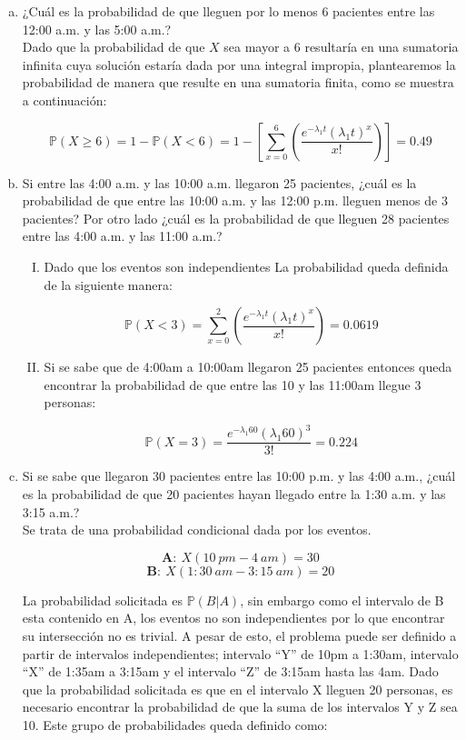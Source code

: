 \documentclass[11pt, spanish]{article}
\begin{document}
\begin{enumerate}[(a)]
\item ¿Cuál es la probabilidad de que lleguen por lo menos 6 pacientes entre las 12:00
a.m. y las 5:00 a.m.?\\

Dado que la probabilidad de que $X$ sea mayor a 6 resultaría en una sumatoria
infinita cuya solución estaría dada por una integral impropia, plantearemos la
probabilidad de manera que resulte en una sumatoria finita, como se muestra a
continuación:

$$\mathbb{P}(X \geq 6) = 1 - \mathbb{P}(X < 6)  = 1 - \left[ \sum_{x = 0}^{6} \left( \frac{e^{-\lambda_{1} t}(\lambda_{1} t)^{x}}{x!} \right)\right] = 0.49$$

\item Si entre las 4:00 a.m. y las 10:00 a.m. llegaron 25 pacientes, ¿cuál es la
probabilidad de que entre las 10:00 a.m. y las 12:00 p.m. lleguen menos de 3 pacientes? Por
otro lado ¿cuál es la probabilidad de que lleguen 28 pacientes entre las 4:00 a.m. y las 11:00
a.m.?\\

\begin{enumerate}[(I)]

\item Dado que los eventos son independientes La probabilidad queda definida de la
siguiente manera:

 $$\mathbb{P}(X < 3) = \sum_{x = 0}^{2} \left( \frac{e^{-\lambda_{1} t}(\lambda_{1} t)^{x}}{x!} \right) = 0.0619$$
 
\item Si se sabe que de 4:00am a 10:00am llegaron 25 pacientes entonces queda
encontrar la probabilidad de que entre las 10 y las 11:00am llegue 3 personas:

 $$\mathbb{P}(X = 3) =  \frac{e^{-\lambda_{1} 60}(\lambda_{1} 60)^{3}}{3!} = 0.224 $$

\end{enumerate}

\item Si se sabe que llegaron 30 pacientes entre las 10:00 p.m. y las 4:00 a.m., ¿cuál
es la probabilidad de que 20 pacientes hayan llegado entre la 1:30 a.m. y las 3:15 a.m.?\\

Se trata de una probabilidad condicional dada por los eventos.

$$\textbf{A}:\ X(10 \ pm-4 \ am) = 30$$
$$\textbf{B}:\ X(1:30 \ am-3:15 \ am) = 20$$

La probabilidad solicitada es $\mathbb{P}(B|A)$, sin embargo como el intervalo de B esta
contenido en A, los eventos no son independientes por lo que encontrar su
intersección no es trivial. A pesar de esto, el problema puede ser definido a partir
de intervalos independientes; intervalo “Y” de 10pm a 1:30am, intervalo “X” de
1:35am a 3:15am y el intervalo “Z” de 3:15am hasta las 4am. Dado que la
probabilidad solicitada es que en el intervalo X lleguen 20 personas, es necesario
encontrar la probabilidad de que la suma de los intervalos Y y Z sea 10. Este grupo
de probabilidades queda definido como:


\end{enumerate}
\end{document}

